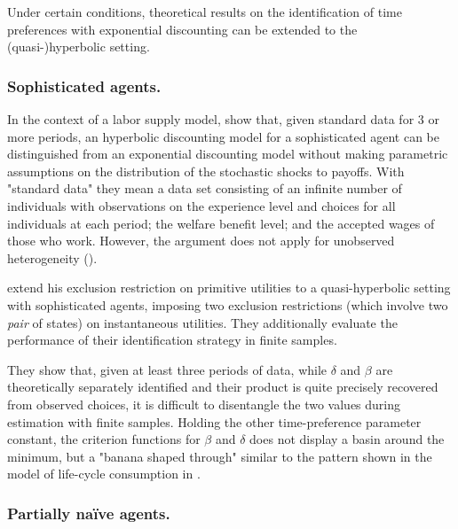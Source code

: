 Under certain conditions, theoretical results on the identification of time preferences with exponential discounting can be extended to the (quasi-)hyperbolic setting. 

\subsubsection{Sophisticated agents.}

In the context of a labor supply model, \textcite{FangSilverman2006} show that, given standard data for 3 or more periods, an hyperbolic discounting model for a sophisticated agent can be distinguished from an exponential discounting model without making parametric assumptions on the distribution of the stochastic shocks to payoffs. With "standard data" they mean a data set consisting of an infinite number of individuals with observations on the experience level and choices for all individuals at each period; the welfare benefit level; and the accepted wages of those who work.
However, the argument does not apply for unobserved heterogeneity (\cite{FangSilverman2009}).

\textcite{Abbring2018} extend his exclusion restriction on primitive utilities to a quasi-hyperbolic setting with sophisticated agents, imposing two exclusion restrictions (which involve two \textit{pair} of states) on instantaneous utilities. They additionally evaluate the performance of their identification strategy in finite samples.  

They show that, given at least three periods of data, while $\delta$ and $\beta$ are theoretically separately identified and their product is quite precisely recovered from observed choices, it is difficult to disentangle the two values during estimation with finite samples. Holding the other time-preference parameter constant, the criterion functions for $\beta$ and $\delta$ does not display a basin around the minimum, but a "banana shaped through" similar to the pattern shown in the model of life-cycle consumption in \textcite{LaibsonRepetto2007}.

\subsubsection{Partially naïve agents.}


